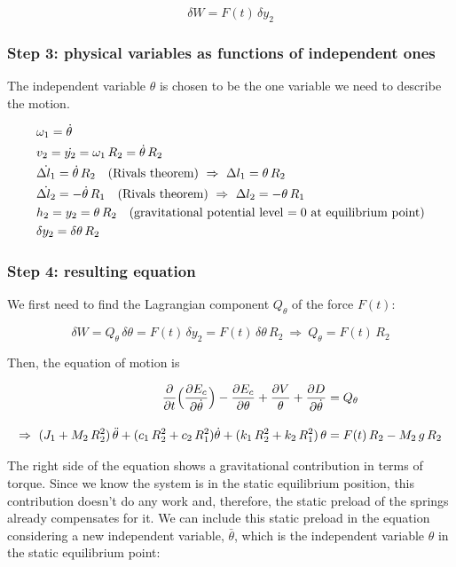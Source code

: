 \documentclass[a4paper,12pt,oneside]{article}
\begin{document}
\[ \delta W = F(t) \, \delta y_2 \]

\subsubsection*{Step 3: physical variables as functions of independent ones}

The independent variable $ \theta $ is chosen to be the one variable we need to describe the motion.

\[ \begin{split}
	& \omega_1 = \dot{\theta} \\
	& v_2 = \dot{y_2} = \omega_1 \, R_2 = \dot{\theta} \, R_2 \\
	& \dot{\Delta l_1} = \dot{\theta} \, R_2 \quad \text{(Rivals theorem)}
		~ \Rightarrow ~ \Delta l_1 = \theta \, R_2 \\
	& \dot{\Delta l_2} = - \dot{\theta} \, R_1 \quad \text{(Rivals theorem)}
		~ \Rightarrow ~ \Delta l_2 = - \theta \, R_1 \\
	& h_2 = y_2 = \theta \, R_2
		\quad \text{(gravitational potential level $ = 0 $ at equilibrium point)} \\
	& \delta y_2 = \delta \theta \, R_2 \\
\end{split} \]

\subsubsection*{Step 4: resulting equation}

We first need to find the Lagrangian component $ Q_\theta $ of the force $ F(t) $:

\[
	\delta W = Q_\theta \, \delta \theta =
		F(t) \, \delta y_2 = F(t) \, \delta \theta \, R_2 ~ \Rightarrow ~
		Q_\theta = F(t) \, R_2
\]

Then, the equation of motion is

\begin{align}
	\frac{\partial}{\partial t}
		\Bigl(\frac{\partial E_c}{\partial \dot{\theta}}\Bigr) -
		\frac{\partial E_c}{\partial \theta} +
		\frac{\partial V}{\theta} +
		\frac{\partial D}{\partial \dot{\theta}} & = Q_\theta \\[10pt]
	\Rightarrow ~ (J_1 + M_2 \, R_2^2) \,	\ddot{\theta} +
		(c_1 \, R_2^2 + c_2 \, R_1^2)	\dot{\theta} +
		(k_1 \, R_2^2 + k_2 \, R_1^2) \, \theta & = F(t) \, R_2 - M_2 \, g \, R_2
\end{align}

The right side of the equation shows a gravitational contribution in terms of torque. Since we know the system is in the static equilibrium position, this contribution doesn't do any work and, therefore, the static preload of the springs already compensates for it. We can include this static preload in the equation considering a new independent variable, $ \bar{\theta} $, which is the independent variable $ \theta $ in the static equilibrium point:
\end{document}
